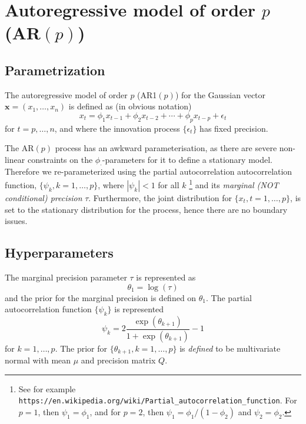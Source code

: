 \documentclass[a4paper,11pt]{article}
\begin{document}
\section*{Autoregressive model of order $p$ (AR$(p)$)}

\subsection*{Parametrization}

The autoregressive model of order $p$ (AR1$(p)$) for the Gaussian vector
$\mathbf{x}=(x_1,\dots,x_n)$ is defined as (in obvious notation)
\begin{displaymath}
    x_{t} = \phi_{1}x_{t-1} + \phi_{2}x_{t-2} + \cdots + \phi_{p}
    x_{t-p} + \epsilon_{t}
\end{displaymath}
for $t = p, \ldots, n$, and where the innovation process
$\{\epsilon_{t}\}$ has fixed precision.

The AR$(p)$ process has an awkward parameterisation, as there are
severe non-linear constraints on the $\phi_{\cdot}$-parameters for it
to define a stationary model. Therefore we re-parameterized using the
partial autocorrelation autocorrelation function, $\{\psi_{k}, k=1,
\ldots, p\}$, where $|\psi_{k}|< 1$ for all $k$ \footnote{See for
    example
    \texttt{https://en.wikipedia.org/wiki/Partial\_autocorrelation\_function}.
    For $p=1$, then $\psi_{1} = \phi_{1}$, and for $p=2$, then
    $\psi_{1} = \phi_{1}/(1-\phi_{2})$ and $\psi_{2} = \phi_{2}$.}
and its \emph{marginal (NOT conditional) precision}
$\tau$. Furthermore, the joint distribution for $\{x_{t}, t=1, \ldots,
p\}$, is set to the stationary distribution for the process, hence
there are no boundary issues.

\subsection*{Hyperparameters}

The marginal precision parameter $\tau$ is represented as
\begin{displaymath}
    \theta_1 =\log(\tau) 
\end{displaymath}
and the prior for the marginal precision is defined on
$\theta_{1}$. The partial autocorrelation function $\{\psi_{k}\}$ is
represented
\begin{displaymath}
    \psi_{k} = 2\frac{\exp(\theta_{k+1})}{1+\exp(\theta_{k+1})} -1
\end{displaymath}
for $k = 1, \ldots, p$. The prior for $\{\theta_{k+1}, k=1, \ldots,
p\}$ is \emph{defined} to be multivariate normal with mean $\mu$ and
precision matrix $Q$.
\end{document}
